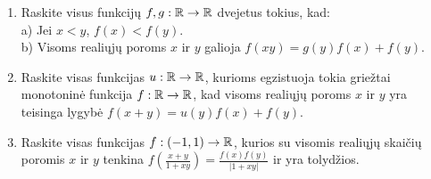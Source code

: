 \begin{enumerate}
  \item Raskite visus funkcijų  $f,g:\mathbb R\rightarrow\mathbb R$ dvejetus tokius,
    kad:\\
    a) Jei $x<y$, $f(x)<f(y)$.\\
    b) Visoms realiųjų poroms $x$ ir $y$ galioja $f(xy)=g(y)f(x)+f(y)$.
  \item Raskite visas funkcijas  $u:\mathbb R\to\mathbb R$, kurioms egzistuoja tokia
    griežtai monotoninė funkcija $f:\mathbb R\to\mathbb R$, kad visoms realiųjų poroms
    $x$ ir $y$ yra teisinga lygybė $f(x+y)=u(y)f(x)+f(y)$.
  \item Raskite visas funkcijas $f:(-1,1)\rightarrow\mathbb R$, kurios su visomis
    realiųjų skaičių poromis $x$ ir $y$ tenkina
    $f(\frac{x+y}{1+xy})=\frac{f(x)f(y)}{|1+xy|}$ ir yra tolydžios.

\end{enumerate}
